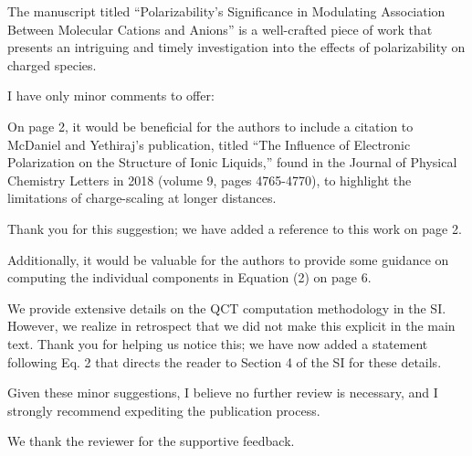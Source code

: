 \documentclass[answers,12pt]{exam}
\begin{document}
\begin{questions}

	\question The manuscript titled ``Polarizability's Significance in Modulating Association Between Molecular Cations and Anions'' is a well-crafted piece of work that presents an intriguing and timely investigation into the effects of polarizability on charged species.
    
    I have only minor comments to offer:

On page 2, it would be beneficial for the authors to include a citation to McDaniel and Yethiraj's publication, titled ``The Influence of Electronic Polarization on the Structure of Ionic Liquids,'' found in the Journal of Physical Chemistry Letters in 2018 (volume 9, pages 4765-4770), to highlight the limitations of charge-scaling at longer distances.

    \begin{solution}
    Thank you for this suggestion; we have added a reference to this work on page 2.
    \end{solution}
 
    \question Additionally, it would be valuable for the authors to provide some guidance on computing the individual components in Equation (2) on page 6.
    \begin{solution}
    We provide extensive details on the QCT computation methodology in the SI. However, we realize in retrospect that we did not make this explicit in the main text. Thank you for helping us notice this; we have now added a statement following Eq. 2 that directs the reader to Section 4 of the SI for these details. 
    \end{solution}
 
    \question Given these minor suggestions, I believe no further review is necessary, and I strongly recommend expediting the publication process.
    \begin{solution}
    We thank the reviewer for the supportive feedback.
    \end{solution}
 \end{questions}
\end{document}
